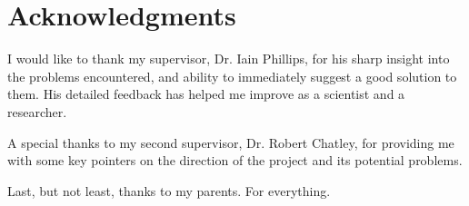 
\chapter{Acknowledgments} %

\label{Acknowledgments} %


I would like to thank my supervisor, Dr. Iain Phillips, for his sharp insight into the problems encountered, and ability to immediately suggest a good solution to them. His detailed feedback has helped me improve as a scientist and a researcher.

A special thanks to my second supervisor, Dr. Robert Chatley, for providing me with some key pointers on the direction of the project and its potential problems.

Last, but not least, thanks to my parents. For everything.

